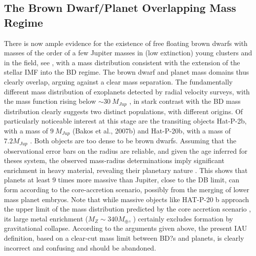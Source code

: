\subsection {The Brown Dwarf/Planet Overlapping Mass Regime}
There is now ample evidence for the existence of free floating brown dwarfs with
masses of the order of a few Jupiter masses in (low extinction) young clusters and in the field, see \cite[e.g.][]{Caballero2007}, 
with a mass distribution consistent with the extension of the stellar IMF into the BD regime. The brown
dwarf and planet mass domains thus clearly overlap, arguing against a clear mass separation. The fundamentally
different mass distribution of exoplanets detected by radial velocity surveys, with the mass function rising below
$\sim 30~ M_{Jup}$ \citep{Mayor2011}, in stark contrast with the BD mass distribution clearly suggests two 
distinct populations, with different origins.
Of particularly noticeable interest at this stage are the transiting objects Hat-P-2b, with a mass of $9~ M_{Jup}$ 
(Bakos et al., 2007b) and Hat-P-20b, with a mass of $7.2 M_{Jup}$ \citep{Bakos2011}. Both objects are too dense to be brown
dwarfs. Assuming that the observational error bars on the radius are reliable, and given the age inferred for theses 
system, the observed mass-radius determinations imply significant enrichment in heavy material, revealing their planetary
nature \citep{Leconte2009, Leconte2011}. This shows that planets at least 9 times more massive than Jupiter, close to the
DB limit, can form according to the core-accretion scenario, possibly from the merging of lower mass planet embryos.
Note that while massive objects like HAT-P-20 b approach the upper limit of the mass distribution predicted by the core
accretion scenario \citep{Mordasini2012b}, its large metal enrichment ($M_Z \sim 340 M_{\oplus}$, \cite{Leconte2011}) 
certainly excludes formation by gravitational collapse.
According to the arguments given above, the present IAU definition, based on a
clear-cut mass limit between BD?s and planets, is clearly incorrect and confusing and should be abandoned.

